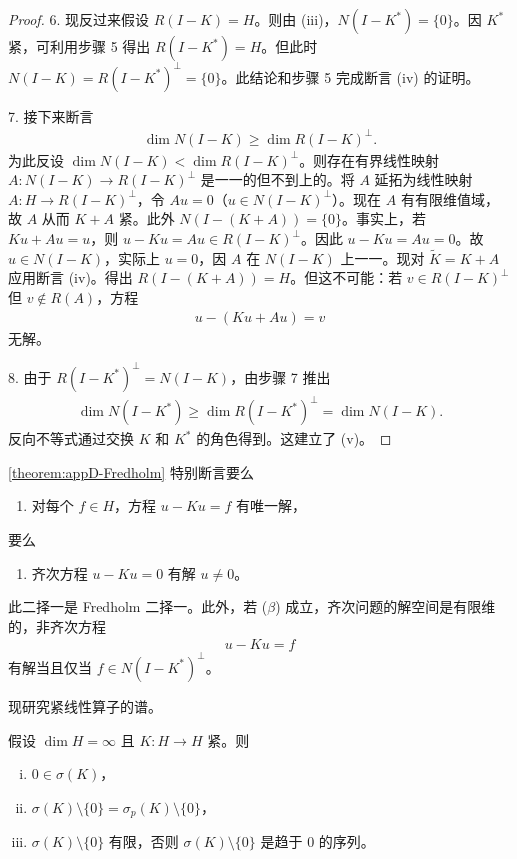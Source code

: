 \documentclass[../main.tex]{subfiles}
\begin{document}
\begin{proof}
6. 现反过来假设 $R(I-K)=H$。则由 (iii)，$N(I-K^*)=\{0\}$。因 $K^*$ 紧，可利用步骤 5 得出 $R(I-K^*)=H$。但此时 $N(I-K)=R(I-K^*)^\perp=\{0\}$。此结论和步骤 5 完成断言 (iv) 的证明。

7. 接下来断言
\begin{align*}
\dim N(I-K)\geqslant\dim R(I-K)^\perp.
\end{align*}
为此反设 $\dim N(I-K)<\dim R(I-K)^\perp$。则存在有界线性映射 $A:N(I-K)\to R(I-K)^\perp$ 是一一的但不到上的。将 $A$ 延拓为线性映射 $A:H\to R(I-K)^\perp$，令 $Au=0$（$u\in N(I-K)^\perp$）。现在 $A$ 有有限维值域，故 $A$ 从而 $K+A$ 紧。此外 $N(I-(K+A))=\{0\}$。事实上，若 $Ku+Au=u$，则 $u-Ku=Au\in R(I-K)^\perp$。因此 $u-Ku=Au=0$。故 $u\in N(I-K)$，实际上 $u=0$，因 $A$ 在 $N(I-K)$ 上一一。现对 $\widetilde{K}=K+A$ 应用断言 (iv)。得出 $R(I-(K+A))=H$。但这不可能：若 $v\in R(I-K)^\perp$ 但 $v\notin R(A)$，方程
\begin{align*}
u-(Ku+Au)=v
\end{align*}
无解。

8. 由于 $R(I-K^*)^\perp=N(I-K)$，由步骤 7 推出
\begin{align*}
\dim N(I-K^*)\geqslant\dim R(I-K^*)^\perp=\dim N(I-K).
\end{align*}
反向不等式通过交换 $K$ 和 $K^*$ 的角色得到。这建立了 (v)。
\end{proof}

\begin{remark}\label{remark:appD-Fredholm二择一}
\cref{theorem:appD-Fredholm} 特别断言要么
\begin{enumerate}[($\alpha$)]
\item 对每个 $f\in H$，方程 $u-Ku=f$ 有唯一解，
\end{enumerate}
要么
\begin{enumerate}[($\beta$)]
\item 齐次方程 $u-Ku=0$ 有解 $u\neq 0$。
\end{enumerate}
此二择一是 Fredholm 二择一。此外，若 ($\beta$) 成立，齐次问题的解空间是有限维的，非齐次方程
\begin{align}
u-Ku=f
\label{align:appD-Fredholm非齐次}
\end{align}
有解当且仅当 $f\in N(I-K^*)^\perp$。
\end{remark}

现研究紧线性算子的谱。

\begin{theorem}[紧算子的谱。]\label{theorem:appD-紧算子谱}假设 $\dim H=\infty$ 且 $K:H\to H$ 紧。则
\begin{enumerate}[(i)]
\item $0\in\sigma(K)$，
\item $\sigma(K)\setminus\{0\}=\sigma_p(K)\setminus\{0\}$，
\item $\sigma(K)\setminus\{0\}$ 有限，否则 $\sigma(K)\setminus\{0\}$ 是趋于 $0$ 的序列。
\end{enumerate}
\end{theorem}
\end{document}
